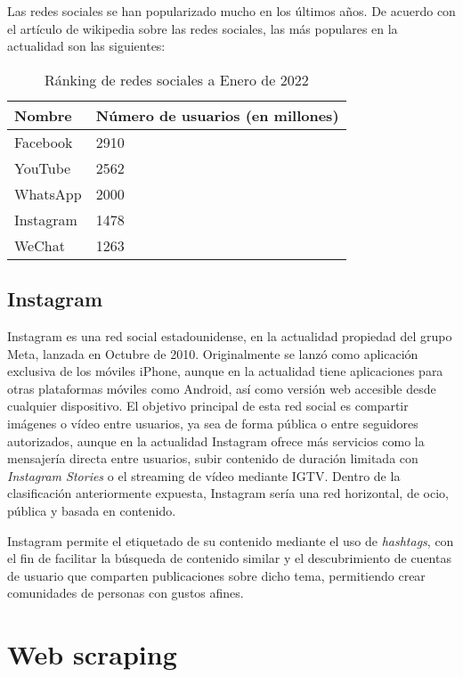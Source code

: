 Las redes sociales se han popularizado mucho en los últimos años. De acuerdo con el artículo de wikipedia sobre las redes sociales, las más populares en la actualidad son las siguientes:

\begin{table}[h]
    \centering
    \begin{tabular}{|l|l|}
        \hline
        Nombre    & Número de usuarios (en millones) \\ \hline
        Facebook  & 2910              \\ \hline
        YouTube   & 2562              \\ \hline
        WhatsApp  & 2000              \\ \hline
        Instagram & 1478              \\ \hline
        WeChat    & 1263              \\ \hline
    \end{tabular}
    \caption{Ránking de redes sociales a Enero de 2022}
    \label{tab:socmed_ranking}
\end{table}

\subsection{Instagram}

Instagram es una red social estadounidense, en la actualidad propiedad del grupo Meta, lanzada en Octubre de 2010. Originalmente se lanzó como aplicación exclusiva de los móviles iPhone, aunque en la actualidad tiene aplicaciones para otras plataformas móviles como Android, así como versión web accesible desde cualquier dispositivo. El objetivo principal de esta red social es compartir imágenes o vídeo entre usuarios, ya sea de forma pública o entre seguidores autorizados, aunque en la actualidad Instagram ofrece más servicios como la mensajería directa entre usuarios, subir contenido de duración limitada con \textit{Instagram Stories} o el streaming de vídeo mediante IGTV. Dentro de la clasificación anteriormente expuesta, Instagram sería una red horizontal, de ocio, pública y basada en contenido.

Instagram permite el etiquetado de su contenido mediante el uso de \textit{hashtags}, con el fin de facilitar la búsqueda de contenido similar y el descubrimiento de cuentas de usuario que comparten publicaciones sobre dicho tema, permitiendo crear comunidades de personas con gustos afines.

\section{Web scraping}

